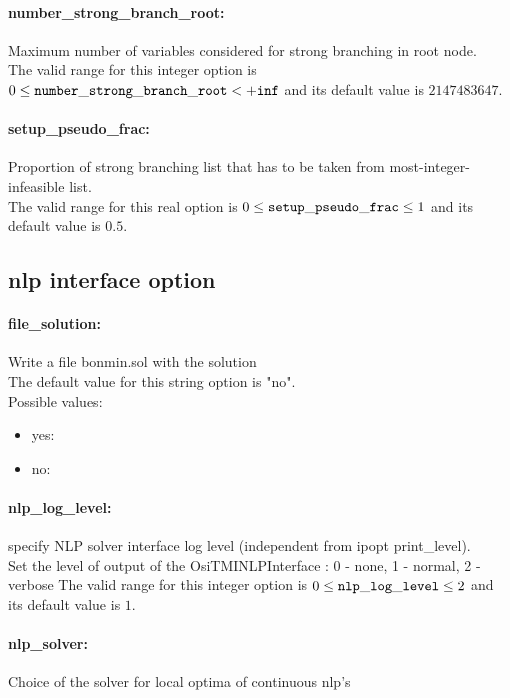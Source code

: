\paragraph{number\_strong\_branch\_root:} Maximum number of variables considered for strong branching in root node. $\;$ \\
 The valid range for this integer option is
$0 \le {\tt number\_strong\_branch\_root } <  {\tt +inf}$
and its default value is $2147483647$.


\paragraph{setup\_pseudo\_frac:} Proportion of strong branching list that has to be taken from most-integer-infeasible list. $\;$ \\
 The valid range for this real option is 
$0 \le {\tt setup\_pseudo\_frac } \le 1$
and its default value is $0.5$.


\subsection{nlp interface option}
\label{sec:nlp_interface_option}
\paragraph{file\_solution:} Write a file bonmin.sol with the solution $\;$ \\

The default value for this string option is "no".
\\ 
Possible values:
\begin{itemize}
   \item yes: 
   \item no: 
\end{itemize}

\paragraph{nlp\_log\_level:} specify NLP solver interface log level (independent from ipopt print\_level). $\;$ \\
 Set the level of output of the OsiTMINLPInterface
: 0 - none, 1 - normal, 2 - verbose The valid range for this integer option is
$0 \le {\tt nlp\_log\_level } \le 2$
and its default value is $1$.


\paragraph{nlp\_solver:} Choice of the solver for local optima of continuous nlp's $\;$ \\

